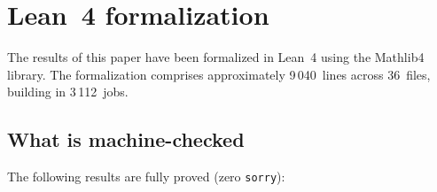 \documentclass[manuscript]{aomart}
\theoremstyle{plain}
\theoremstyle{definition}
\theoremstyle{remark}
\numberwithin{equation}{section}
\begin{document}
\section{Lean~4 formalization}\label{sec:lean}

The results of this paper have been formalized in Lean~4 using the
Mathlib4 library.  The formalization comprises approximately
9\,040~lines across 36~files, building in 3\,112~jobs.

\subsection{What is machine-checked}

The following results are fully proved (zero \texttt{sorry}):
\end{document}

